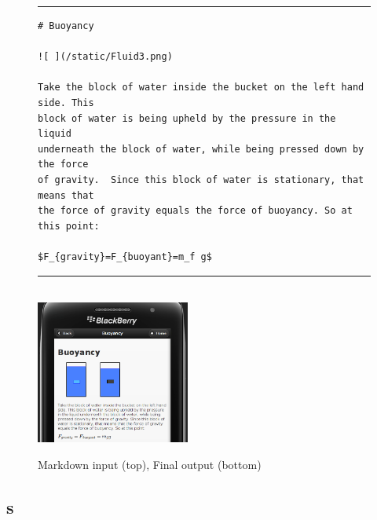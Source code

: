 \documentclass[12pt,a4paper]{article}  %
\begin{document}
\begin{figure}[htb]
\rule[0.5ex]{1\columnwidth}{1pt}
\footnotesize
\begin{verbatim}
# Buoyancy

![ ](/static/Fluid3.png)

Take the block of water inside the bucket on the left hand side. This
block of water is being upheld by the pressure in the liquid
underneath the block of water, while being pressed down by the force
of gravity.  Since this block of water is stationary, that means that
the force of gravity equals the force of buoyancy. So at this point:

$F_{gravity}=F_{buoyant}=m_f g$
\end{verbatim}
\rule[0.5ex]{1\columnwidth}{1pt}
\\[2mm]
\centering
\includegraphics[width=0.45\textwidth]{buoyancy.png}
\caption{Markdown input (top), Final output (bottom)}
\label{fig:md}
\end{figure}


\subsection{s}





































\end{document}
